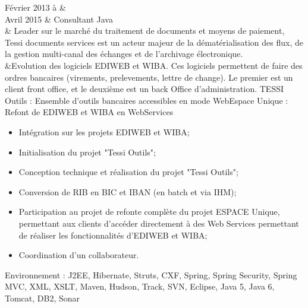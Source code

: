 Février 2013 à &  \\%
Avril 2015     & Consultant Java \\%
			   & Leader sur le marché du traitement de documents et moyens de paiement, 
			   Tessi documents services est un acteur majeur de la dématérialisation des flux, 
			   de la gestion multi-canal des échanges et de l'archivage électronique. \\%
			   &Evolution des logiciels EDIWEB et WIBA. Ces logiciels permettent de faire des ordres bancaires (virements, prelevements, lettre de change).
			   Le premier est un client  front office, et le deuxième est un back Office d'administration.
			   TESSI Outils : 
			   Ensemble d'outils bancaires accessibles en mode WebEspace Unique : Refont de EDIWEB et WIBA en WebServices%
			   \begin{itemize}%
    				\item Intégration sur les projets EDIWEB et WIBA;%
    				\item Initialisation du projet "Tessi Outils";%
    				\item Conception technique et réalisation du projet "Tessi Outils";%
    				\item Conversion de RIB en BIC et IBAN (en batch et via IHM);%
    				\item Participation au projet de refonte complète du projet ESPACE Unique, permettant aux clients d'accéder 
    				directement à des Web Services permettant de réaliser les fonctionnalités d'EDIWEB et WIBA;%
    				\item Coordination d'un collaborateur.%
			   \end{itemize}%
Environnement : J2EE, Hibernate, Struts, CXF, Spring, Spring Security, Spring MVC, XML, XSLT, Maven, Hudson, Track, SVN, Eclipse, Java 5, Java 6, Tomcat, DB2, Sonar \\\\
